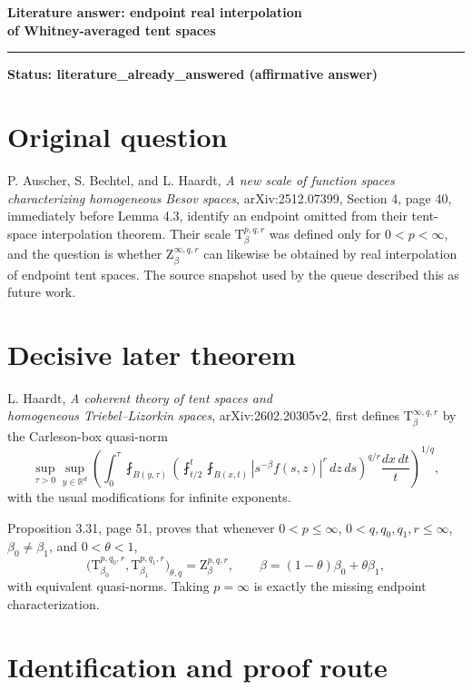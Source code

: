\documentclass[10pt]{article}
\newcommand{\statusbox}[1]{%
  \begin{center}
  \colorbox{panel}{\parbox{0.91\linewidth}{\centering\color{accent}\bfseries #1}}
  \end{center}}
\newcommand{\Tsp}{\mathrm T}
\newcommand{\Zsp}{\mathrm Z}
\begin{document}
{\large\bfseries Literature answer: endpoint real interpolation\\[-0.1em]
of Whitney-averaged tent spaces\par}

\vspace{0.35em}
{\color{accent}\rule{\linewidth}{1.1pt}}

\statusbox{Status: literature\_already\_answered (affirmative answer)}

\section*{Original question}

P. Auscher, S. Bechtel, and L. Haardt,
\emph{A new scale of function spaces characterizing homogeneous Besov
spaces}, arXiv:2512.07399, Section 4, page 40, immediately before Lemma 4.3,
identify an endpoint omitted from their tent-space interpolation theorem.
Their scale $\Tsp^{p,q,r}_\beta$ was defined only for $0<p<\infty$, and the
question is whether $\Zsp^{\infty,q,r}_\beta$ can likewise be obtained by
real interpolation of endpoint tent spaces.  The source snapshot used by the
queue described this as future work.

\section*{Decisive later theorem}

L. Haardt, \emph{A coherent theory of tent spaces and}\\
\emph{homogeneous Triebel--Lizorkin spaces}, arXiv:2602.20305v2, first
defines
$\Tsp^{\infty,q,r}_\beta$ by the Carleson-box quasi-norm
\[
 \sup_{\tau>0}\sup_{y\in\mathbb R^d}
 \left(\int_0^\tau \fint_{B(y,\tau)}
 \left(\fint_{t/2}^{t}\fint_{B(x,t)}
 |s^{-\beta}f(s,z)|^r\,dz\,ds\right)^{q/r}
 \frac{dx\,dt}{t}\right)^{1/q},
\]
with the usual modifications for infinite exponents.

Proposition 3.31, page 51, proves that whenever
$0<p\leq\infty$, $0<q,q_0,q_1,r\leq\infty$,
$\beta_0\ne\beta_1$, and $0<\theta<1$,
\[
 \bigl(\Tsp^{p,q_0,r}_{\beta_0},
       \Tsp^{p,q_1,r}_{\beta_1}\bigr)_{\theta,q}
 =\Zsp^{p,q,r}_{\beta},
 \qquad
 \beta=(1-\theta)\beta_0+\theta\beta_1,
\]
with equivalent quasi-norms.  Taking $p=\infty$ is exactly the missing
endpoint characterization.

\section*{Identification and proof route}
\end{document}
